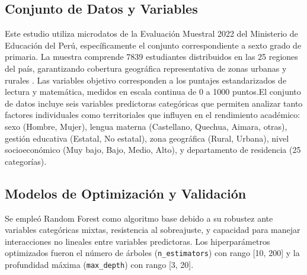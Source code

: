 \documentclass[conference]{IEEEtran}
\begin{document}
\subsection{Conjunto de Datos y Variables}
Este estudio utiliza microdatos de la Evaluación Muestral 2022 del Ministerio de Educación del Perú, específicamente el conjunto correspondiente a sexto grado de primaria. La muestra comprende 7839 estudiantes distribuidos en las 25 regiones del país, garantizando cobertura geográfica representativa de zonas urbanas y rurales \cite{minedu2022em}. Las variables objetivo corresponden a los puntajes estandarizados de lectura y matemática, medidos en escala continua de 0 a 1000 puntos.El conjunto de datos incluye seis variables predictoras categóricas que permiten analizar tanto factores individuales como territoriales que influyen en el rendimiento académico: sexo (Hombre, Mujer), lengua materna (Castellano, Quechua, Aimara, otras), gestión educativa (Estatal, No estatal), zona geográfica (Rural, Urbana), nivel socioeconómico (Muy bajo, Bajo, Medio, Alto), y departamento de residencia (25 categorías).

\begin{table}[htbp]
\caption{Variables del conjunto de datos}
\label{tab:variables}
\end{table}

\subsection{Modelos de Optimización y Validación}
Se empleó Random Forest como algoritmo base debido a su robustez ante variables categóricas mixtas, resistencia al sobreajuste, y capacidad para manejar interacciones no lineales entre variables predictoras. Los hiperparámetros optimizados fueron el número de árboles (\texttt{n\_estimators}) con rango [10, 200] y la profundidad máxima (\texttt{max\_depth}) con rango [3, 20].
\end{document}
